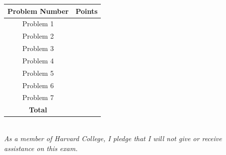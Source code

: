 \documentclass{article}
\begin{document}
    \centering
    \begin{tabular}{|c|c|}
    \hline
      \textbf{Problem Number}   & \textbf{Points}  \\
             \hline \hline
                Problem 1   &   \\
            \hline
                 Problem 2 &   \\
        \hline 
                Problem 3 &   \\
        \hline 
                Problem 4 &   \\
        \hline 
                Problem 5 &   \\
        \hline 
                Problem 6 &   \\        
        \hline 
                Problem 7 & \\
        \hline
         \textbf{Total} &   \\
         \hline 
    \end{tabular}\\
\vspace{0.5in}
\emph{As a member of Harvard College, I pledge that I will not give or receive assistance on this exam.}\\
\\

\newpage
\end{document}
